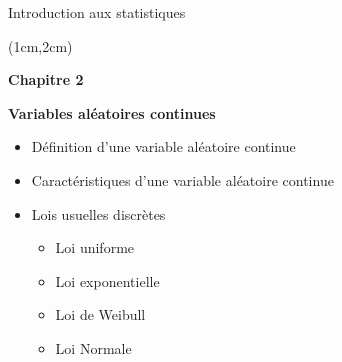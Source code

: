 \documentclass{beamer}
\begin{document}
    

\begin{frame}{Introduction aux statistiques}
\begin{textblock*}{\textwidth}(1cm,2cm)

\begin{center}{\bf \Large Chapitre 2} \end{center}
\begin{center}{\bf \Large Variables aléatoires continues} \end{center}
\vspace{0.3cm}
\begin{itemize}
\item Définition d'une variable aléatoire continue 
\item Caractéristiques d'une variable aléatoire continue
\item Lois usuelles discrètes 
\begin{itemize}
\item Loi uniforme
\item Loi exponentielle
\item Loi de Weibull
\item Loi Normale 
\end{itemize}
\end{itemize}

 \end{textblock*}

\end{frame}    
    
\end{document}
